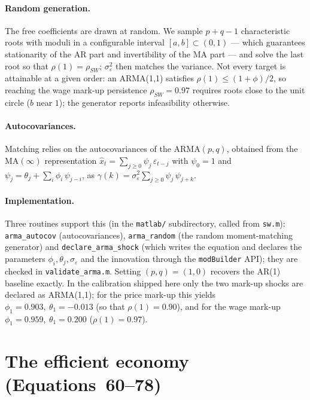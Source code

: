 \documentclass[11pt,a4paper]{article}
\begin{document}
\paragraph{Random generation.}
The free coefficients are drawn at random. We sample $p+q-1$ characteristic
roots with moduli in a configurable interval $[a,b]\subset(0,1)$ --- which
guarantees stationarity of the AR part and invertibility of the MA part --- and
solve the last root so that $\rho(1)=\rho_{SW}$; $\sigma_\varepsilon^2$ then
matches the variance. Not every target is attainable at a given order: an
ARMA(1,1) satisfies $\rho(1)\le(1+\phi)/2$, so reaching the wage mark-up
persistence $\rho_{SW}=0.97$ requires roots close to the unit circle ($b$ near
$1$); the generator reports infeasibility otherwise.

\paragraph{Autocovariances.}
Matching relies on the autocovariances of the ARMA$(p,q)$, obtained from the
MA$(\infty)$ representation $\hat x_t=\sum_{j\ge0}\psi_j\,\varepsilon_{t-j}$ with
$\psi_0=1$ and $\psi_j=\theta_j+\sum_{i}\phi_i\,\psi_{j-i}$, as
$\gamma(k)=\sigma_\varepsilon^2\sum_{j\ge0}\psi_j\,\psi_{j+k}$.

\paragraph{Implementation.}
Three routines support this (in the \texttt{matlab/} subdirectory, called from
\texttt{sw.m}): \texttt{arma\_autocov} (autocovariances), \texttt{arma\_random}
(the random moment-matching generator) and \texttt{declare\_arma\_shock} (which
writes the equation and declares the parameters $\phi_i,\theta_j,\sigma_\varepsilon$
and the innovation through the \texttt{modBuilder} API); they are checked in
\texttt{validate\_arma.m}. Setting
$(p,q)=(1,0)$ recovers the AR(1) baseline exactly. In the calibration shipped
here only the two mark-up shocks are declared as ARMA(1,1); for the price
mark-up this yields $\phi_1=0.903,\ \theta_1=-0.013$ (so that $\rho(1)=0.90$),
and for the wage mark-up $\phi_1=0.959,\ \theta_1=0.200$ ($\rho(1)=0.97$).


\section{The efficient economy (Equations~60--78)}
\label{sec:efficient}
\end{document}
